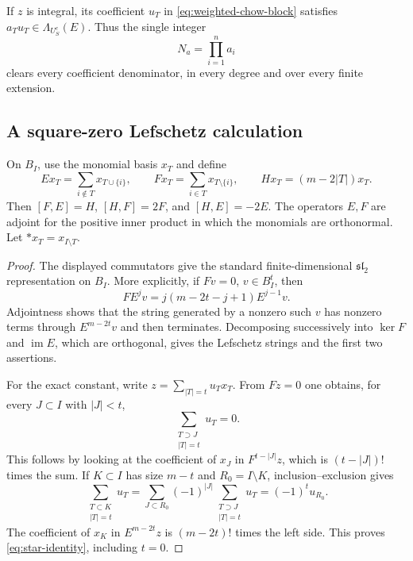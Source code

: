 \documentclass[11pt,a4paper]{article}
\newtheorem{lemma}[theorem]{Lemma}
\theoremstyle{definition}
\DeclareRobustCommand{\MathEqref}[1]{\begingroup\hypersetup{linkcolor=MathEquationLink}\eqref{#1}\endgroup}
\newcommand{\im}{\operatorname{im}}\newcommand{\Griff}{\operatorname{Griff}}
\numberwithin{equation}{section}
\begin{document}
If \(z\) is integral, its coefficient \(u_T\) in
\MathEqref{eq:weighted-chow-block} satisfies
\(a_Tu_T\in\Lambda_{U_S^c}(E)\). Thus the single integer
\begin{equation}\label{eq:coordinate-denominator}
 N_a=\prod_{i=1}^n a_i
\end{equation}
clears every coefficient denominator, in every degree and over every
finite extension.

\subsection{A square-zero Lefschetz calculation}\label{sec:square-zero}

On \(B_I\), use the monomial basis \(x_T\) and define
\[
 E x_T=\sum_{i\notin T}x_{T\cup\{i\}},\qquad
 F x_T=\sum_{i\in T}x_{T\setminus\{i\}},\qquad
 Hx_T=(m-2|T|)x_T.
\]
Then \([F,E]=H\), \([H,F]=2F\), and \([H,E]=-2E\).
The operators \(E,F\) are adjoint for the positive inner product
in which the monomials are orthonormal. Let
\(*x_T=x_{I\setminus T}\).


\begin{proof}
The displayed commutators give the standard finite-dimensional
\(\mathfrak{sl}_2\) representation on \(B_I\). More explicitly,
if \(Fv=0\), \(v\in B_I^t\), then
\[
 FE^jv=j(m-2t-j+1)E^{j-1}v.
\]
Adjointness shows that the string generated by a nonzero such \(v\)
has nonzero terms through \(E^{m-2t}v\) and then terminates.
Decomposing successively into \(\ker F\) and \(\im E\), which
are orthogonal, gives the Lefschetz strings and the first two
assertions.

For the exact constant, write \(z=\sum_{|T|=t}u_Tx_T\).
From \(Fz=0\) one obtains, for every \(J\subset I\) with
\(|J|<t\),
\[
 \sum_{\substack{T\supset J\\|T|=t}}u_T=0.
\]
This follows by looking at the coefficient of \(x_J\) in
\(F^{t-|J|}z\), which is \((t-|J|)!\) times the sum. If
\(K\subset I\) has size \(m-t\) and \(R_0=I\setminus K\),
inclusion--exclusion gives
\[
 \sum_{\substack{T\subset K\\|T|=t}}u_T
 =\sum_{J\subset R_0}(-1)^{|J|}
       \sum_{\substack{T\supset J\\|T|=t}}u_T
 =(-1)^tu_{R_0}.
\]
The coefficient of \(x_K\) in \(E^{m-2t}z\) is
\((m-2t)!\) times the left side. This proves
\MathEqref{eq:star-identity}, including \(t=0\).
\end{proof}
\end{document}
